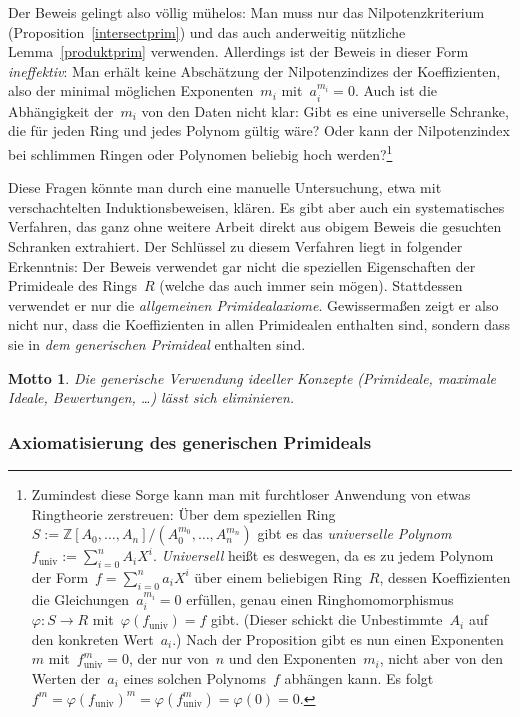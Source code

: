 \documentclass[a4paper,ngerman,12pt]{scrartcl}
\theoremstyle{definition}
\theoremstyle{plain}
\newtheorem{motto}[defn]{Motto}
\theoremstyle{remark}
\newcommand{\ZZ}{\mathbb{Z}}
\renewcommand{\_}{\mathpunct{.}\,}
\newcommand{\?}{\,{:}\,}
\begin{document}
Der Beweis gelingt also völlig mühelos: Man muss nur
das Nilpotenzkriterium (Proposition~\ref{intersectprim}) und das auch anderweitig nützliche
Lemma~\ref{produktprim} verwenden. Allerdings ist der Beweis in dieser Form
\emph{ineffektiv}: Man erhält keine Abschätzung der Nilpotenzindizes der
Koeffizienten, also der minimal möglichen Exponenten~$m_i$ mit~$a_i^{m_i} = 0$.
Auch ist die Abhängigkeit der~$m_i$ von den Daten nicht klar: Gibt es eine
universelle Schranke, die für jeden Ring und jedes Polynom gültig wäre? Oder
kann der Nilpotenzindex bei schlimmen Ringen oder Polynomen beliebig hoch
werden?\footnote{Zumindest diese Sorge kann man mit furchtloser Anwendung von
etwas Ringtheorie zerstreuen: Über dem speziellen Ring~$S :=
\ZZ[A_0,\ldots,A_n]/(A_0^{m_0},\ldots,A_n^{m_n})$ gibt es das \emph{universelle
Polynom} $f_\text{univ} := \sum_{i=0}^n A_i X^i$. \emph{Universell} heißt es
deswegen, da es zu jedem Polynom der Form~$f = \sum_{i=0}^n a_i X^i$ über einem
beliebigen Ring~$R$, dessen Koeffizienten die Gleichungen~$a_i^{m_i} = 0$
erfüllen, genau einen Ringhomomorphismus~$\varphi : S \to R$
mit~$\varphi(f_\text{univ}) = f$ gibt. (Dieser schickt die Unbestimmte~$A_i$
auf den konkreten Wert~$a_i$.) Nach der Proposition gibt es nun einen
Exponenten~$m$ mit~$f_\text{univ}^m = 0$, der nur von~$n$ und den
Exponenten~$m_i$, nicht aber von den Werten der~$a_i$ eines solchen
Polynoms~$f$ abhängen kann. Es folgt~$f^m = \varphi(f_\text{univ})^m =
\varphi(f_\text{univ}^m) = \varphi(0) = 0$.}

Diese Fragen könnte man durch eine manuelle Untersuchung, etwa mit
verschachtelten Induktionsbeweisen, klären. Es gibt aber auch ein
systematisches Verfahren, das ganz ohne weitere Arbeit direkt aus obigem Beweis die
gesuchten Schranken extrahiert. Der Schlüssel zu diesem Verfahren liegt in
folgender Erkenntnis: Der Beweis verwendet gar nicht die speziellen
Eigenschaften der Primideale des Rings~$R$ (welche das auch immer sein mögen).
Stattdessen verwendet er nur die \emph{allgemeinen Primidealaxiome}. Gewissermaßen
zeigt er also nicht nur, dass die Koeffizienten in allen Primidealen enthalten
sind, sondern dass sie in \emph{dem generischen Primideal} enthalten sind.

\begin{motto}Die \emph{generische} Verwendung ideeller Konzepte (Primideale,
maximale Ideale, Bewertungen, \ldots) lässt sich eliminieren.\end{motto}


\subsubsection*{Axiomatisierung des generischen Primideals}
\end{document}
